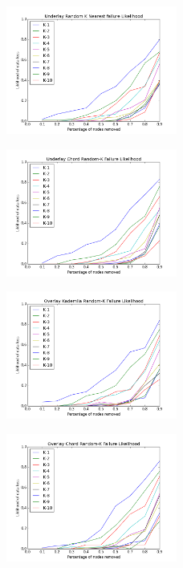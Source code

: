 \documentclass[conference]{IEEEtran}
\begin{document}
\begin{figure}
	\includegraphics[width=0.5\textwidth]{figs/underlay_kad_random}
\end{figure}
\begin{figure}
	\includegraphics[width=0.5\textwidth]{figs/underlay_chord_random}
\end{figure}
\begin{figure}
	\includegraphics[width=0.5\textwidth]{figs/overlay_kad_random}
\end{figure}
\begin{figure}
	\includegraphics[width=0.5\textwidth]{figs/overlay_chord_random}
\end{figure}
\end{document}
